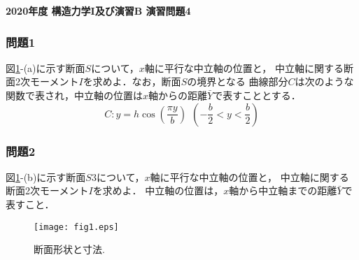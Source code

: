 \documentclass[10pt,a4j]{jarticle}
\newlength{\minitwocolumn}
\begin{document}
\newcommand{\fat}[1]{\mbox{\boldmath $#1$}}
\newcommand{\D}{\partial}
\newcommand{\w}{\omega}
\newcommand{\ga}{\alpha}
\newcommand{\gb}{\beta}
\newcommand{\gx}{\xi}
\newcommand{\gz}{\zeta}
\newcommand{\vhat}[1]{\hat{\fat{#1}}}
\newcommand{\spc}{\vspace{0.7\baselineskip}}
\newcommand{\halfspc}{\vspace{0.3\baselineskip}}

\pagestyle{empty}
\newcommand{\twofig}[2]
 {
   \begin{figure}[h]
     \begin{minipage}[t]{\minitwocolumn}
         \begin{center}   #1
         \end{center}
     \end{minipage}
         \hspace{\columnsep}
     \begin{minipage}[t]{\minitwocolumn}
         \begin{center} #2
         \end{center}
     \end{minipage}
   \end{figure}
 }
\begin{center}
{\Large \bf 2020年度 構造力学I及び演習B 演習問題4} \\
\end{center}
\subsubsection*{問題1}
図\ref{fig:fig1}-(a)に示す断面$S$について，$x$軸に平行な中立軸の位置と，
中立軸に関する断面2次モーメント$I$を求めよ．なお，断面$S$の境界となる
曲線部分$C$は次のような関数で表され，中立軸の位置は$x$軸からの距離$\bar{Y}$で表すこととする．
\begin{equation}
	C: y=h \cos \left( \frac{\pi y}{b}\right) 
	\ \ \left(-\frac{b}{2} < y < \frac{b}{2} \right)
\end{equation}
\subsubsection*{問題2}
図\ref{fig:fig1}-(b)に示す断面$S3$について，$x$軸に平行な中立軸の位置と，
中立軸に関する断面2次モーメント$I$を求めよ．
中立軸の位置は，$x$軸から中立軸までの距離$\bar{Y}$で表すこと．

\vspace{15mm}
\begin{figure}[h]
	\begin{center}
	\texttt{[image: fig1.eps]} 
	\end{center}
	\caption{断面形状と寸法.} 
	\label{fig:fig1}
\end{figure}
\end{document}
